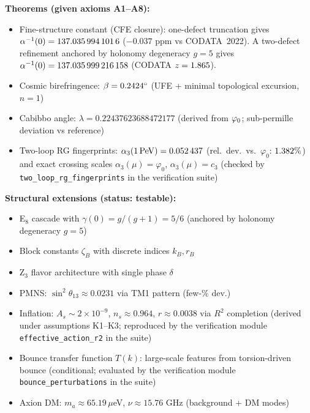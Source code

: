 \vspace{1em}
\begin{tcolorbox}[colback=gray!5, colframe=gray!60, title={\textbf{Claim Map: What This Paper Establishes}}, fonttitle=\bfseries]
\textbf{Theorems (given axioms A1--A8):}
\begin{itemize}[leftmargin=1.5em, topsep=2pt, itemsep=1pt]
    \item Fine-structure constant (CFE closure): one-defect truncation gives $\alpha^{-1}(0)=\num[round-mode=places,round-precision=10]{\TFPTalphaInvSelfNum}$ ($-0.037$ ppm vs CODATA~2022). A two-defect refinement anchored by holonomy degeneracy $g=5$ gives $\alpha^{-1}(0)=\num[round-mode=places,round-precision=12]{\TFPTalphaInvGOverFourNum}$ (CODATA $z=\num[round-mode=places,round-precision=3]{\TFPTalphaZGOverFourNum}$).
    \item Cosmic birefringence: $\beta = \num[round-mode=places,round-precision=4]{\TFPTbetaDegNum}^\circ$ (UFE + minimal topological excursion, $n=1$)
    \item Cabibbo angle: $\lambda = \num[round-mode=places,round-precision=6]{0.22437623688472177}$ (derived from $\varphi_0$; sub-permille deviation vs reference)
    \item Two-loop RG fingerprints: $\alpha_3(1\,\mathrm{PeV})=\num[round-mode=places,round-precision=6]{\TFPTalphaThreePeVNum}$ (rel.\ dev.\ vs.\ $\varphi_0$: $\num[round-mode=places,round-precision=3]{\TFPTalphaThreePeVRelDevPercent}\%$) and exact crossing scales $\alpha_3(\mu)=\varphi_0$, $\alpha_3(\mu)=c_3$ (checked by \texttt{two\_loop\_rg\_fingerprints} in the verification suite)
\end{itemize}

\textbf{Structural extensions (status: testable):}
\begin{itemize}[leftmargin=1.5em, topsep=2pt, itemsep=1pt]
    \item E$_8$ cascade with $\gamma(0)=g/(g+1)=5/6$ (anchored by holonomy degeneracy $g=5$)
    \item Block constants $\zeta_B$ with discrete indices $k_B, r_B$
    \item Z$_3$ flavor architecture with single phase $\delta$
    \item PMNS: $\sin^2\theta_{13} \approx 0.0231$ via TM1 pattern (few-\% dev.)
    \item Inflation: $A_s \sim 2\times10^{-9}$, $n_s \approx 0.964$, $r \approx 0.0038$ via $R^2$ completion (derived under assumptions K1--K3; reproduced by the verification module \texttt{effective\_action\_r2} in the suite)
    \item Bounce transfer function $T(k)$: large-scale features from torsion-driven bounce (conditional; evaluated by the verification module \texttt{bounce\_perturbations} in the suite)
    \item Axion DM: $m_a \approx 65.19\,\mu$eV, $\nu \approx 15.76$ GHz (background + DM modes)
\end{itemize}


\end{tcolorbox}
